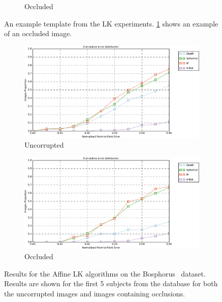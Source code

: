 \begin{figure}[t]
\begin{subfigure}[b]{0.3\textwidth}
    	\caption{Occluded}\label{subfig:singl_img_depth_2d_lk_template_occluded}
    \end{subfigure}
    \hspace*{\fill}
    \caption{An example template from the LK experiments.
             \cref{subfig:singl_img_depth_2d_lk_template_occluded} shows an
             example of an occluded image.}
\label{fig:single_img_2d_lk_examples}
\end{figure}
\begin{figure}[t]
    \centering
    \hspace*{\fill}
    \begin{subfigure}[b]{0.45\textwidth}
    	\includegraphics[width=\textwidth]{statistical_normals/images/lk2d/lk_first_5_bosphorus.pdf}
    	\caption{Uncorrupted}\label{subfig:singl_img_depth_lk_results_clean}
    \end{subfigure} \hfill
    \begin{subfigure}[b]{0.45\textwidth}
    	\includegraphics[width=\textwidth]{statistical_normals/images/lk2d/lk_first_5_bosphorus_dirty.pdf}
    	\caption{Occluded}\label{subfig:singl_img_depth_lk_results_dirty}
    \end{subfigure}
    \hspace*{\fill}
    \caption{Results for the Affine LK algorithms on the 
             Bosphorus~\cite{Savran:2008gg} dataset. Results are shown for the
             first 5 subjects from the database for both the uncorrupted images 
             and images containing occlusions.}
\label{fig:single_img_2d_lk_results}
\end{figure}

